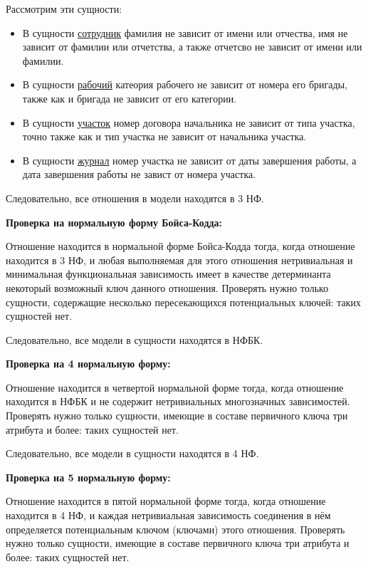 Рассмотрим эти сущности:

\begin{itemize}
    \item В сущности \underline{сотрудник} фамилия не зависит от имени или отчества, имя не зависит от фамилии или отчетства, а также отчетсво не зависит от имени или фамилии.

    \item В сущности \underline{рабочий} катеория рабочего не зависит от номера его бригады, также как и бригада не зависит от его категории.

    \item В сущности \underline{участок} номер договора начальника не зависит от типа участка, точно также как и тип участка не зависит от начальника участка.

    \item В сущности \underline{журнал} номер участка не зависит от даты завершения работы, а дата завершения работы не завист от номера участка.

\end{itemize}

Следовательно, все отношения в модели находятся в 3 НФ.

{\bf Проверка на нормальную форму Бойса-Кодда:}

Отношение находится в нормальной форме Бойса-Кодда тогда, когда отношение находится в 3 НФ, и любая выполняемая для этого отношения нетривиальная и минимальная функциональная зависимость имеет в качестве детерминанта некоторый возможный ключ данного отношения.
Проверять нужно только сущности, содержащие несколько пересекающихся потенциальных ключей: таких сущностей нет.

Следовательно, все модели в сущности находятся в НФБК.

{\bf Проверка на 4 нормальную форму:}

Отношение находится в четвертой нормальной форме тогда, когда отношение находится в НФБК и не содержит нетривиальных многозначных зависимостей.
Проверять нужно только сущности, имеющие в составе первичного ключа три атрибута и более: таких сущностей нет.

Следовательно, все модели в сущности находятся в 4 НФ.

{\bf Проверка на 5 нормальную форму:}

Отношение находится в пятой нормальной форме тогда, когда отношение находится в 4 НФ, и каждая нетривиальная зависимость соединения в нём определяется потенциальным ключом (ключами) этого отношения.
Проверять нужно только сущности, имеющие в составе первичного ключа три атрибута и более: таких сущностей нет.

